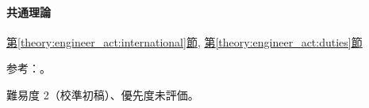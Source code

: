 \paragraph{共通理論} \hyperref[theory:engineer_act:international]{第\ref*{theory:engineer_act:international}節}, \hyperref[theory:engineer_act:duties]{第\ref*{theory:engineer_act:duties}節}

\par 参考：\cite{engineer_act_current,ipej_associate_registration,jabee_canberra,ipej_ipea2014,mext_international,jaeic_mutual2010}。

\par 難易度 2（校準初稿）、優先度未評価。
